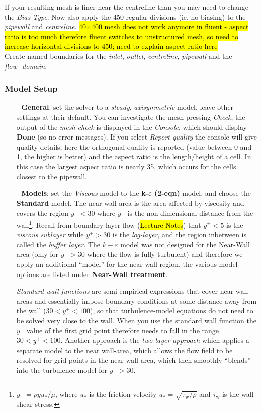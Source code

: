 \documentclass[11pt,a4paper,oneside]{scrartcl}
\newcommand\bfr[1]{\textcolor[rgb]{1,0.00,0.00}{\textbf{\textsf{#1}}}}
\begin{document}
If your resulting mesh is finer near the centreline than you may need to change the \emph{Bias Type}. Now also apply the 450 regular divisions (ie, no biasing) to the {\it pipewall} and {\it centreline}. \hl{40$\times$400 mesh does not work anymore in fluent - aspect ratio is too much therefore fluent switches to unstructured mesh, so need to increase horizontal divisions to 450; need to explain aspect ratio here}\\
Create named boundaries for the \emph{inlet}, \emph{outlet}, \emph{centreline}, \emph{pipewall} and the \emph{flow\_domain}.


\subsubsection*{Model Setup}

\begin{itemize}
    \item[-] \textbf{General}: set the solver to a \emph{steady}, \emph{axisymmetric} model, leave other settings at their default. You can investigate the mesh pressing \emph{Check}, the output of the {\it mesh check} is displayed in the \emph{Console}, which should display \bfr{Done} (so no error messages). If you select \emph{Report quality} the console will give quality details, here the orthogonal quality is reported (value between 0 and 1, the higher is better) and the aspect ratio is the length/height of a cell. In this case the largest aspect ratio is nearly 35, which occurs for the cells closest to the pipewall.
    \item[-] \textbf{Models}: set the \emph{Viscous} model to the \bfr{k-$\varepsilon$ (2-eqn)} model, and choose the \bfr{Standard} model. The near wall area is the area affected by viscosity and covers the region $y^+<30$ where $y^+$ is the non-dimensional distance from the wall\footnote{$y^+=\rho yu_{*}/\mu$, where $u_{*}$ is the friction velocity $u_{*}=\sqrt{\tau_\mathrm{w}/\rho}$ and $\tau_\mathrm{w}$ is the wall shear stress.}. Recall from boundary layer flow (\hl{Lecture Notes}) that $y^+<5$ is the \emph{viscous sublayer} while $y^+>30$ is the \emph{log-layer}, and the region inbetween is called the \emph{buffer layer}. The $k-\varepsilon$ model was not designed for the Near-Wall area (only for $y^+>30$ where the flow is fully turbulent) and therefore we apply an additional ``model'' for the near wall region, the various model options are listed under \bfr{Near-Wall treatment}.
      
      \emph{Standard wall functions} are semi-empirical expressions that cover near-wall areas and essentially impose boundary conditions at some distance away from the wall ($30 < y^+ < 100$), so that turbulence-model equations do not need to be solved very close to the wall. When you use the standard wall function the $y^+$ value of the first grid point therefore needs to fall in the range $30 < y^+ < 100$. Another approach is the \emph{two-layer approach} which applies a separate model to the near wall-area, which allows the flow field to be resolved for grid points in the near-wall area, which then smoothly ``blends'' into the turbulence model for $y^+>30$.


\end{itemize}
\end{document}
